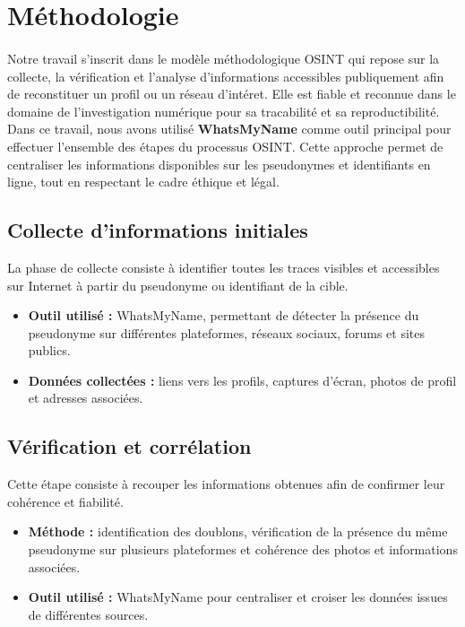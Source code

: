 \documentclass[memoire,12pt]{report}
\begin{document}
\section{Méthodologie}
 \paragraph{} Notre travail s'inscrit dans le modèle méthodologique OSINT qui repose sur la collecte, la vérification et l'analyse d'informations accessibles publiquement afin de reconstituer un profil ou un réseau d'intéret. Elle est fiable et reconnue dans le domaine de l'investigation numérique pour sa tracabilité et sa reproductibilité.\\
Dans ce travail, nous avons utilisé \textbf{WhatsMyName} comme outil principal pour effectuer l’ensemble des étapes du processus OSINT. Cette approche permet de centraliser les informations disponibles sur les pseudonymes et identifiants en ligne, tout en respectant le cadre éthique et légal.

\subsection{Collecte d’informations initiales}
La phase de collecte consiste à identifier toutes les traces visibles et accessibles sur Internet à partir du pseudonyme ou identifiant de la cible.  

\begin{itemize}
    \item \textbf{Outil utilisé :} WhatsMyName, permettant de détecter la présence du pseudonyme sur différentes plateformes, réseaux sociaux, forums et sites publics.
    \item \textbf{Données collectées :} liens vers les profils, captures d’écran, photos de profil et adresses associées.
\end{itemize}

\subsection{Vérification et corrélation}
Cette étape consiste à recouper les informations obtenues afin de confirmer leur cohérence et fiabilité.

\begin{itemize}
    \item \textbf{Méthode :} identification des doublons, vérification de la présence du même pseudonyme sur plusieurs plateformes et cohérence des photos et informations associées.
    \item \textbf{Outil utilisé :} WhatsMyName pour centraliser et croiser les données issues de différentes sources.
\end{itemize}
\end{document}
